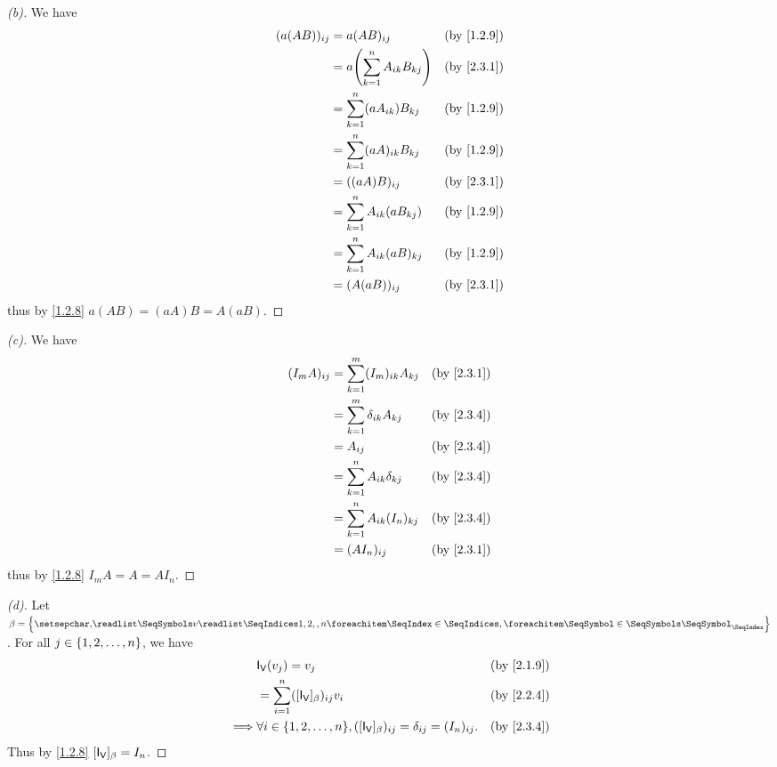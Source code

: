 \begin{proof}[(b)]
  We have
  \begin{align*}
    (a (AB))_{i j} & = a (AB)_{i j}                          &  & \text{(by \cref{1.2.9})} \\
                   & = a \pa{\sum_{k = 1}^n A_{i k} B_{k j}} &  & \text{(by \cref{2.3.1})} \\
                   & = \sum_{k = 1}^n (a A_{i k}) B_{k j}    &  & \text{(by \cref{1.2.9})} \\
                   & = \sum_{k = 1}^n (a A)_{i k} B_{k j}    &  & \text{(by \cref{1.2.9})} \\
                   & = ((aA) B)_{i j}                        &  & \text{(by \cref{2.3.1})} \\
                   & = \sum_{k = 1}^n A_{i k} (a B_{k j})    &  & \text{(by \cref{1.2.9})} \\
                   & = \sum_{k = 1}^n A_{i k} (a B)_{k j}    &  & \text{(by \cref{1.2.9})} \\
                   & = (A (aB))_{i j}                        &  & \text{(by \cref{2.3.1})}
  \end{align*}
  thus by \cref{1.2.8} \(a (AB) = (aA) B = A (aB)\).
\end{proof}

\begin{proof}[(c)]
  We have
  \begin{align*}
    (I_m A)_{i j} & = \sum_{k = 1}^m (I_m)_{i k} A_{k j}  &  & \text{(by \cref{2.3.1})} \\
                  & = \sum_{k = 1}^m \delta_{i k} A_{k j} &  & \text{(by \cref{2.3.4})} \\
                  & = A_{i j}                             &  & \text{(by \cref{2.3.4})} \\
                  & = \sum_{k = 1}^n A_{i k} \delta_{k j} &  & \text{(by \cref{2.3.4})} \\
                  & = \sum_{k = 1}^n A_{i k} (I_n)_{k j}  &  & \text{(by \cref{2.3.4})} \\
                  & = (A I_n)_{i j}                       &  & \text{(by \cref{2.3.1})}
  \end{align*}
  thus by \cref{1.2.8} \(I_m A = A = A I_n\).
\end{proof}

\begin{proof}[(d)]
  Let \(\beta = \set{\seq{v}{1,2,,n}}\).
  For all \(j \in \left\lbrace1, 2, \dots, n\right\rbrace\), we have
  \begin{align*}
             & \IT[\V](v_j) = v_j                                                                          &  & \text{(by \cref{2.1.9})} \\
             & = \sum_{i = 1}^n ([\IT[\V]]_{\beta})_{i j} v_i                                              &  & \text{(by \cref{2.2.4})} \\
    \implies & \forall i \in \set{1, 2, \dots, n}, ([\IT[\V]]_{\beta})_{i j} = \delta_{i j} = (I_n)_{i j}. &  & \text{(by \cref{2.3.4})}
  \end{align*}
  Thus by \cref{1.2.8} \([\IT[\V]]_{\beta} = I_n\).
\end{proof}

